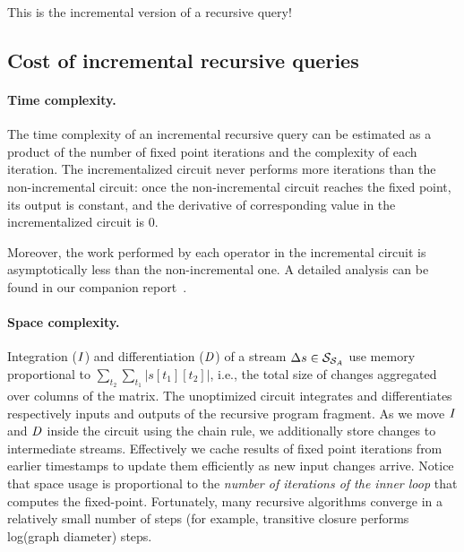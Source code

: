 \noindent This is the incremental version of a recursive query!



\subsection{Cost of incremental recursive queries}

\paragraph{Time complexity.}
The time complexity of an incremental recursive query can be estimated
as a product of the number of fixed point iterations and the
complexity of each iteration. The incrementalized circuit never
performs more iterations than the non-incremental circuit: once the
non-incremental circuit reaches the fixed point, its output is
constant, and the derivative of corresponding value in the
incrementalized circuit is 0.

Moreover, the work performed by each operator in the incremental
circuit is asymptotically less than the non-incremental one.  A
detailed analysis can be found in our companion report~\cite{tr}.


\paragraph{Space complexity.} Integration ($\mathit{I}$) and differentiation ($\mathit{D}$) of a
stream $\Delta s \in \mathcal{S}_{\mathcal{S}_{A}}$ use memory proportional to
$\sum_{t_2}\sum_{t_1}|s[t_1][t_2]|$, i.e., the total size of changes
aggregated over columns of the matrix.  The unoptimized circuit integrates
and differentiates respectively inputs and outputs of the recursive program
fragment.  As we move $\mathit{I}$ and $\mathit{D}$ inside the circuit using the chain rule, we
additionally store changes to intermediate streams.  Effectively we cache results of
fixed point iterations from earlier timestamps to update them efficiently as new input changes arrive.
Notice that space usage is proportional to the \emph{number of iterations of the inner loop}
that computes the fixed-point.
Fortunately, many recursive algorithms converge in a relatively small number of steps
(for example, transitive closure performs log(graph diameter) steps.
